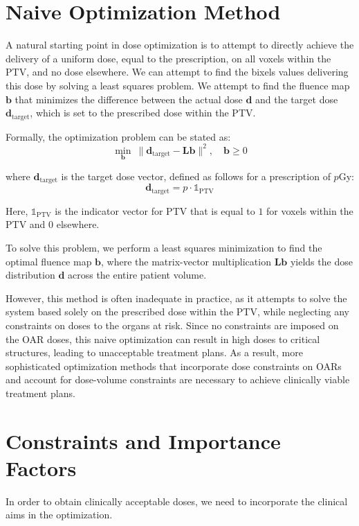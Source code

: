 \section{Naive Optimization Method}
\label{naive_optimization}
A natural starting point in dose optimization is to attempt to directly achieve the delivery of a uniform dose, equal to the prescription, on all voxels within the PTV, and no dose elsewhere.
We can attempt to find the bixels values delivering this dose by solving a least squares problem.
We attempt to find the fluence map $\mathbf{b}$ that minimizes the difference between the actual dose $\mathbf{d}$ and the target dose $\mathbf{d}_{\text{target}}$, which is set to the prescribed dose within the PTV.

Formally, the optimization problem can be stated as:
$$ \min_\mathbf{b} \ \| \mathbf{d}_{\text{target}} - \textbf{L}\mathbf{b} \|^2, \quad \mathbf{b} \geq 0$$

where $\mathbf{d}_{\text{target}}$ is the target dose vector, defined as follows for a prescription of $p$Gy:
$$ \mathbf{d}_{\text{target}} = p \cdot  \mathds{1}_{\text{PTV}} $$

Here, $\mathds{1}_{\text{PTV}}$ is the indicator vector for PTV that is equal to $1$ for voxels within the PTV and $0$ elsewhere.

To solve this problem, we perform a least squares minimization to find the optimal fluence map $\mathbf{b}$, where the matrix-vector multiplication $\textbf{L}\mathbf{b}$ yields the dose distribution $\mathbf{d}$ across the entire patient volume.

However, this method is often inadequate in practice, as it attempts to solve the system based solely on the prescribed dose within the PTV, while neglecting any constraints on doses to the organs at risk.
Since no constraints are imposed on the OAR doses, this naive optimization can result in high doses to critical structures, leading to unacceptable treatment plans.
As a result, more sophisticated optimization methods that incorporate dose constraints on OARs and account for dose-volume constraints are necessary to achieve clinically viable treatment plans.

\section{Constraints and Importance Factors}
In order to obtain clinically acceptable doses, we need to incorporate the clinical aims in the optimization.

